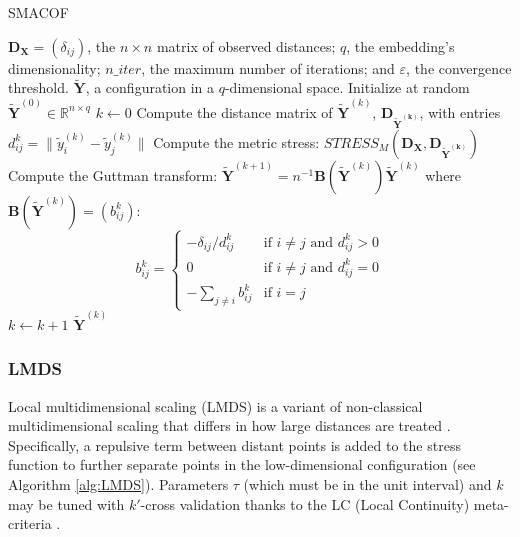 \begin{algorithm}
    \caption{SMACOF}
    \label{alg:SMACOF}
    
    \begin{algorithmic}[1]
    \REQUIRE $\mathbf{D}_{\boldsymbol{\mathbf{X}}} = (\delta_{ij})$, the $n\times n$ matrix of observed distances; $q$, the embedding's dimensionality; $n\_iter$, the maximum number of iterations; and $\varepsilon$, the convergence threshold.
    \ENSURE $\boldsymbol{\mathbf{\tilde{Y}}}$, a configuration in a $q$-dimensional space.
    \STATE Initialize at random $\boldsymbol{\mathbf{\tilde{Y}}}^{(0)} \in \mathbb{R}^{n \times q}$
    \STATE $k \leftarrow 0$
    \REPEAT
        \STATE Compute the distance matrix of $\boldsymbol{\mathbf{\tilde{Y}}}^{(k)}$, $\mathbf{D}_{\boldsymbol{\mathbf{\tilde{Y}}^{(k)}}}$, with entries $d_{ij}^k = \|\tilde{y}_i^{(k)} - \tilde{y}_j^{(k)}\|$
        \STATE Compute the metric stress: $STRESS_M( \mathbf{D}_{\mathbf{X}}, \mathbf{D}_{\boldsymbol{\mathbf{\tilde{Y}}^{(k)}}} )$
        \STATE Compute the Guttman transform: $\boldsymbol{\mathbf{\tilde{Y}}}^{(k+1)} = n^{-1}\mathbf{B}(\boldsymbol{\mathbf{\tilde{Y}}}^{(k)})\boldsymbol{\mathbf{\tilde{Y}}}^{(k)}$ where $\mathbf{B}(\boldsymbol{\mathbf{\tilde{Y}}}^{(k)}) = (b_{ij}^k)$:
        $$
        b_{ij}^k =
        \begin{cases}
        -\delta_{ij}/d_{ij}^k & \text{if } i \neq j \text{ and } d_{ij}^k > 0 \\
        0 & \text{if } i \neq j \text{ and } d_{ij}^k = 0 \\
        -\sum_{j \neq i} b_{ij}^k & \text{if } i = j
        \end{cases}
        $$
        \STATE $k \leftarrow k + 1$
    \RETURN $\boldsymbol{\mathbf{\tilde{Y}}}^{(k)}$
    \end{algorithmic}
\end{algorithm}

\subsubsection{LMDS}

Local multidimensional scaling (LMDS) is a variant of non-classical multidimensional scaling that differs in how large distances are treated \citep{Chen2009}. Specifically, a repulsive term between distant points is added to the stress function to further separate points in the low-dimensional configuration (see Algorithm \ref{alg:LMDS}). Parameters $\tau$ (which must be in the unit interval) and $k$ may be tuned with $k'$-cross validation thanks to the LC (Local Continuity) meta-criteria \citep{Chen2009}.


